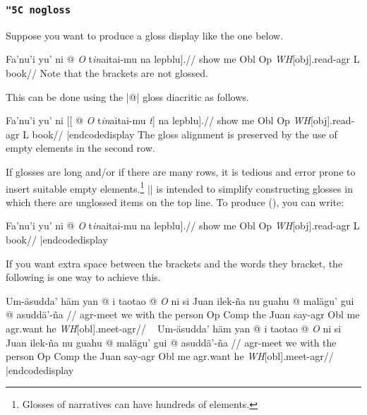 \exbreak
\subsubsection {\tt \char"5C nogloss}

Suppose you want to produce a gloss display like the one below.

\framedisplay
{}
\begingl
\gla Fa'nu'i yu' ni \nogloss{[[} @ {\it O} t{\it in\/}aitai-mu
\nogloss{{\it t\/}]} na {lepblu].}//
\glb show me Obl Op {\it WH\/}[obj].read-agr L book//
\endgl
\xe
\endframedisplay
\noindent Note that the brackets are not glossed.

This can be done using the |@| gloss diacritic as follows.

\codedisplay
{}
\begingl
\gla Fa'nu'i yu' ni {[[} @ {\it O} t{\it in\/}aitai-mu
{{\it t\/}]} na {lepblu].}//
\glb show me Obl {} Op {\it WH\/}[obj].read-agr {} L book//
\endgl
\xe
|endcodedisplay
\noindent The gloss alignment is preserved by the use of empty elements in
the second row.

If glosses are long and/or if there are many rows, it is tedious and
error prone to insert suitable empty elements.\footnote{Glosses of
narratives can have hundreds of elements.} |\nogloss| is intended to
simplify constructing glosses in which there are unglossed items on
the top line.  To produce (\lastx), you can write:

\codedisplay
{}
\begingl
\gla Fa'nu'i yu' ni \nogloss{[[} @ {\it O} t{\it in\/}aitai-mu
\nogloss{{\it t\/}]} na {lepblu].}//
\glb show me Obl Op {\it WH\/}[obj].read-agr L book//
\endgl
\xe
|endcodedisplay

If you want extra space between the brackets and the words they
bracket, the following is one way to achieve this.

\framedisplay
\ex[everygla=,glhangstyle=normal]
\begingl
\gla Um-\"asudda' h\"am yan \nogloss{$[\,$} @ i taotao \nogloss{$[\,$} @
{\it O\/} ni si Juan ilek-\~na nu guahu \nogloss{$[\,$} @ mal\"agu' gui
\nogloss{$[\,$} @
asudd\"a'-\~na \nogloss{{\it t\/}$\,]]]]$.}//
\glb agr-meet we with the person Op Comp the Juan say-agr Obl me
agr.want he {\it WH\/}[obl].meet-agr//
\endgl
\xe
\endframedisplay
\codedisplay~
\ex[everygla=,glhangstyle=normal]
\begingl
\gla Um-\"asudda' h\"am yan \nogloss{$[\,$} @ i taotao \nogloss{$[\,$} @
{\it O\/} ni si Juan ilek-\~na nu guahu \nogloss{$[\,$} @ mal\"agu' gui
\nogloss{$[\,$} @ asudd\"a'-\~na \nogloss{{\it t\/}$\,]]]]$.}//
\glb agr-meet we with the person Op Comp the Juan say-agr Obl me
agr.want he {\it WH\/}[obl].meet-agr//
\endgl
\xe
|endcodedisplay


